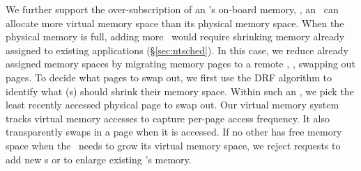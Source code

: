 We further support the over-subscription of an \snic's on-board memory, \ie, an \snic\ can allocate more virtual memory space than its physical memory space.
When the physical memory is full, adding more \nt\ would require shrinking memory already assigned to existing applications (\S\ref{sec:ntsched}).
In this case, we reduce already assigned memory spaces by migrating memory pages to a remote \snic, \ie, swapping out pages.
To decide what pages to swap out, we first use the DRF algorithm to identify what \nt{}(s) should shrink their memory space. 
Within such an \nt, we pick the least recently accessed physical page to swap out.
Our virtual memory system tracks virtual memory accesses to capture per-page access frequency. 
It also transparently swaps in a page when it is accessed.
If no other \snic{} has free memory space when the \snic\ needs to grow its virtual memory space, we reject requests to add new \nt{}s or to enlarge existing \nt{}'s memory.


